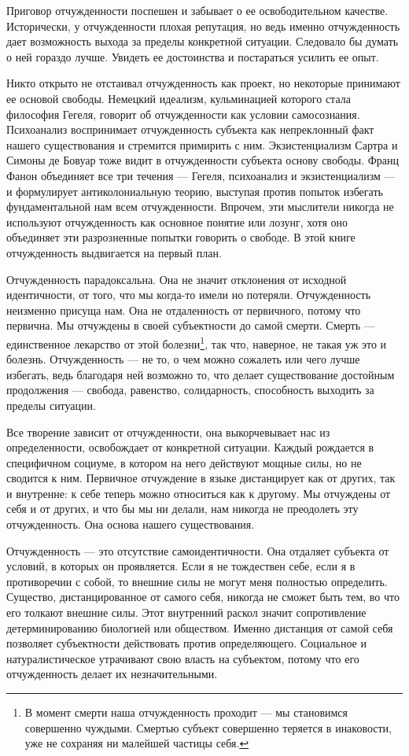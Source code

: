 \documentclass[12pt]{book}
\begin{document}
Приговор отчужденности поспешен и забывает о ее освободительном качестве. Исторически, у отчужденности плохая репутация, но ведь именно отчужденность дает возможность выхода за пределы конкретной ситуации. Следовало бы думать о ней гораздо лучше. Увидеть ее достоинства и постараться усилить ее опыт.

Никто открыто не отстаивал отчужденность как проект, но некоторые принимают ее основой свободы. Немецкий идеализм, кульминацией которого стала философия Гегеля, говорит об отчужденности как условии самосознания. Психоанализ воспринимает отчужденность субъекта как непреклонный факт нашего существования и стремится примирить с ним. Экзистенциализм Сартра и Симоны де Бовуар тоже видит в отчужденности субъекта основу свободы. Франц Фанон объединяет все три течения --- Гегеля, психоанализ и экзистенциализм --- и формулирует антиколониальную теорию, выступая против попыток избегать фундаментальной нам всем отчужденности. Впрочем, эти мыслители никогда не используют отчужденность как основное понятие или лозунг, хотя оно объединяет эти разрозненные попытки говорить о свободе. В этой книге отчужденность выдвигается на первый план.

Отчужденность парадоксальна. Она не значит отклонения от исходной идентичности, от того, что мы когда-то имели но потеряли. Отчужденность неизменно присуща нам. Она не отдаленность от первичного, потому что первична. Мы отчуждены в своей субъектности до самой смерти. Смерть --- единственное лекарство от этой болезни\footnote{В момент смерти наша отчужденность проходит --- мы становимся совершенно чуждыми. Смертью субъект совершенно теряется в инаковости, уже не сохраняя ни малейшей частицы себя.}, так что, наверное, не такая уж это и болезнь. Отчужденность --- не то, о чем можно сожалеть или чего лучше избегать, ведь благодаря ней возможно то, что делает существование достойным продолжения --- свобода, равенство, солидарность, способность выходить за пределы ситуации.

Все творение зависит от отчужденности, она выкорчевывает нас из определенности, освобождает от конкретной ситуации. Каждый рождается в специфичном социуме, в котором на него действуют мощные силы, но не сводится к ним. Первичное отчуждение в языке дистанцирует как от других, так и внутренне: к себе теперь можно относиться как к другому. Мы отчуждены от себя и от других, и что бы мы ни делали, нам никогда не преодолеть эту отчужденность. Она основа нашего существования.

Отчужденность --- это отсутствие самоидентичности. Она отдаляет субъекта от условий, в которых он проявляется. Если я не тождествен себе, если я в противоречии с собой, то внешние силы не могут меня полностью определить. Существо, дистанцированное от самого себя, никогда не сможет быть тем, во что его толкают внешние силы. Этот внутренний раскол значит сопротивление детерминированию биологией или обществом. Именно дистанция от самой себя позволяет субъектности действовать против определяющего. Социальное и натуралистическое утрачивают свою власть на субъектом, потому что его отчужденность делает их незначительными.
\end{document}
